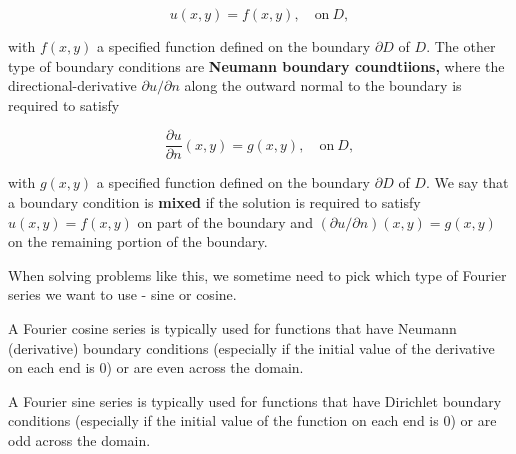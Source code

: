 \documentclass{article}
\begin{document}
\[ u(x,y) = f(x,y), \quad \text{on} ~ D, \]

with $f(x,y)$ a specified function defined on the \@{boundary} $\partial D$ of $D$. The other type of boundary conditions are \textbf{Neumann boundary coundtiions,} where the \@{directional-derivative} $\partial u/\partial n$ along the outward normal to the boundary is required to satisfy

\[ \frac{\partial u}{\partial n}(x,y) = g(x,y), \quad \text{on} ~ D, \]

with $g(x,y)$ a specified function defined on the boundary $\partial D$ of $D.$ We say that a boundary condition is \textbf{mixed} if the solution is required to satisfy $u(x,y) = f(x,y)$ on part of the boundary and $(\partial u / \partial n)(x,y) = g(x,y)$ on the remaining portion of the boundary.

When solving problems like this, we sometime need to pick which type of Fourier series we want to use - sine or cosine.

A Fourier cosine series is typically used for functions that have Neumann (derivative) boundary conditions (especially if the initial value of the derivative on each end is 0) or are even across the domain.

A Fourier sine series is typically used for functions that have Dirichlet boundary conditions (especially if the initial value of the function on each end is 0) or are odd across the domain.
\end{document}
